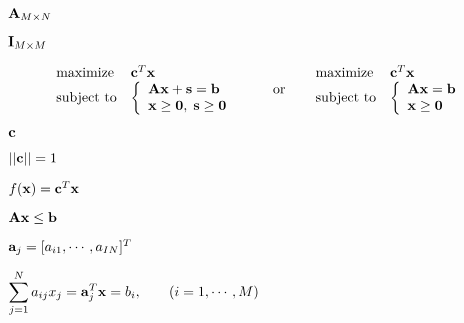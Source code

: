 \documentclass{article}
\def\lthtmlcheckvsize{\ifdim\ht\sizebox<\vsize 
  \ifdim\wd\sizebox<\hsize\expandafter\hfill\fi \expandafter\vfill
  \else\expandafter\vss\fi}%
\begin{document}
{\newpage\clearpage
{}%
$ {\bf A}_{M\times N}$%
\lthtmlindisplaymathZ
\lthtmlcheckvsize\clearpage}

{\newpage\clearpage
{}%
$ {\bf I}_{M\times M}$%
\lthtmlindisplaymathZ
\lthtmlcheckvsize\clearpage}

{\newpage\clearpage
{}%
\begin{displaymath}\begin{array}{ll}
\mbox{maximize} & {\bf c}^T{\bf x}\\
\mbox{subject to} &
\left\{ \begin{array}{l}
{\bf A}{\bf x}+{\bf s}={\bf b}\\
{\bf x}\ge{\bf0},\;{\bf s}\ge{\bf0}
\end{array}\right.
\end{array}
\;\;\;\;\;\;\;\;\mbox{or}\;\;\;\;\;\;
\begin{array}{ll}
\mbox{maximize} & {\bf c}^T{\bf x}\\
\mbox{subject to} &
\left\{ \begin{array}{l}
{\bf A}{\bf x}={\bf b}\\
{\bf x}\ge{\bf0}
\end{array}\right.
\end{array}\end{displaymath}%
\lthtmldisplayZ
\lthtmlcheckvsize\clearpage}

{\newpage\clearpage
{}%
$ {\bf c}$%
\lthtmlindisplaymathZ
\lthtmlcheckvsize\clearpage}

{\newpage\clearpage
{}%
$ ||{\bf c}||=1$%
\lthtmlindisplaymathZ
\lthtmlcheckvsize\clearpage}

{\newpage\clearpage
{}%
$ f({\bf x})={\bf c}^T{\bf x}$%
\lthtmlindisplaymathZ
\lthtmlcheckvsize\clearpage}

{\newpage\clearpage
{}%
$ {\bf A}{\bf x}\le{\bf b}$%
\lthtmlindisplaymathZ
\lthtmlcheckvsize\clearpage}

{\newpage\clearpage
{}%
$ {\bf a}_j=[a_{i1},\cdots,a_{IN}]^T$%
\lthtmlindisplaymathZ
\lthtmlcheckvsize\clearpage}

{\newpage\clearpage
{}%
$\displaystyle \sum_{j=1}^N a_{ij}x_j={\bf a}_j^T{\bf x}=b_i,\;\;\;\;\;\;\;(i=1,\cdots,M)$%
\lthtmlindisplaymathZ
\lthtmlcheckvsize\clearpage}
\end{document}
